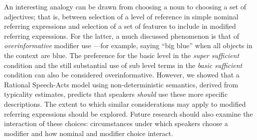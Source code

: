 \documentclass[10pt,letterpaper]{article}
\begin{document}



An interesting analogy can be drawn from choosing a noun to choosing a set of adjectives; that is, between selection of a level of reference in simple nominal referring expressions and selection of a set of features to include in modified referring expressions. 
For the latter, a much discussed phenomenon is that of \emph{overinformative} modifier use \cite{Gatt2014}---for example, saying ``big blue'' when all objects in the context are blue. 
The preference for the basic level in the \emph{super sufficient} condition and the still substantial use of sub level terms in the \emph{basic sufficient} condition can also be considered overinformative. However, we showed that a Rational Speech-Acts model using non-deterministic semantics, derived from typicality estimates, predicts that speakers \emph{should} use these more specific descriptions. 
The extent to which similar considerations may apply to modified referring expressions should be explored.
Future research should also examine the interaction of these choices: circumstances under which speakers choose a modifier and how nominal and modifier choice interact.

\end{document}
